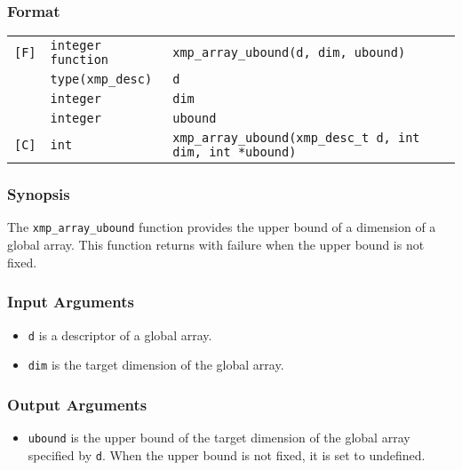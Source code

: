 \subsubsection*{Format}

\begin{tabular}{lll}

\verb![F]!& {\tt integer function}& {\tt xmp\_array\_ubound(d, dim, ubound)}\\
          & {\tt type(xmp\_desc)} & {\tt d}\\
          & {\tt integer} & {\tt dim}\\
          & {\tt integer} & {\tt ubound}\\

\verb![C]!&  {\tt int}& {\tt xmp\_array\_ubound(xmp\_desc\_t d, int dim, int *ubound)}\\

\end{tabular}

\subsubsection*{Synopsis}

The {\tt xmp\_array\_ubound} function provides the upper bound of a
dimension of a global array. This function returns with failure when the
upper bound is not fixed.

\subsubsection*{Input Arguments}
\begin{itemize}
 \item {\tt d} is a descriptor of a global array.
 \item {\tt dim} is the target dimension of the global array.
\end{itemize}

\subsubsection*{Output Arguments}
\begin{itemize}
 \item {\tt ubound} is the upper bound of the target dimension of the
       global array specified by {\tt d}. When the upper bound is not
       fixed, it is set to undefined.
\end{itemize}

